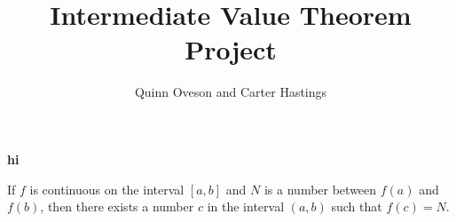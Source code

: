 \documentclass{report}
\title{Intermediate Value Theorem Project}
\author{Quinn Oveson and Carter Hastings}
\begin{document}
\maketitle


\textbf{hi} 
\begin{theorem}
  If $f$ is continuous on the interval $[a, b]$ and $N$ is a number between $f(a)$ and $f(b)$, then there exists a number $c$ in the interval $(a, b)$ such that $f(c) = N$.

\end{theorem}
\end{document}
